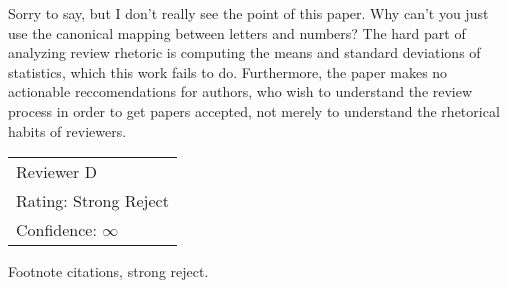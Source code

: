 \documentclass[12pt]{article}
\begin{document}
Sorry to say, but I don't really see the point of this paper.
Why can't you just use the canonical mapping between letters and numbers?
The hard part of analyzing review rhetoric is
computing the means and standard deviations of statistics,
which this work fails to do.
Furthermore, the paper makes no actionable reccomendations for authors,
who wish to understand the review process in order to get papers accepted,
not merely to understand the rhetorical habits of reviewers.


{\large\bf
\begin{tabular}{l}
Reviewer D \\
Rating: Strong Reject \\
Confidence: $\infty$ \\
\end{tabular}}
\vspace{-0.25em}

Footnote citations, strong reject.
\end{document}
